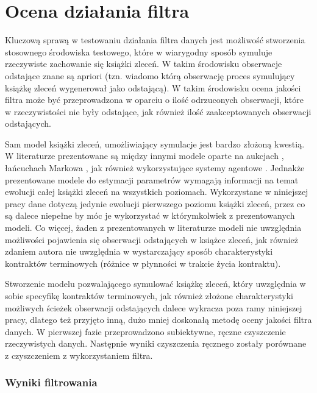 \documentclass[a4paper,12pt,openany, DIV=calc, headsepline]{scrbook}
\begin{document}
\chapter{Ocena działania filtra}

Kluczową sprawą w testowaniu działania filtra danych jest możliwość stworzenia stosownego środowiska testowego, które w wiarygodny sposób symuluje rzeczywiste zachowanie się książki zleceń. W takim środowisku obserwacje odstające znane są apriori (tzn. wiadomo którą obserwację proces symulujący książkę zleceń wygenerował jako odstającą). W takim środowisku ocena jakości filtra może być przeprowadzona w oparciu o ilość odrzuconych obserwacji, które w rzeczywistości nie były odstające, jak również ilość zaakceptowanych obserwacji odstających.

Sam model książki zleceń, umożliwiający symulacje jest bardzo złożoną kwestią. W literaturze prezentowane są między innymi modele oparte na aukcjach \citep{doubleAuction}, łańcuchach Markowa \citep{huang2015simulating}, jak również wykorzystujące systemy agentowe \citep{chiarella2009impact}. Jednakże prezentowane modele do estymacji parametrów wymagają informacji na temat ewolucji całej książki zleceń na wszystkich poziomach. Wykorzystane w niniejszej pracy dane dotyczą jedynie ewolucji pierwszego poziomu książki zleceń, przez co są dalece niepełne by móc je wykorzystać w którymkolwiek z prezentowanych modeli. Co więcej, żaden z prezentowanych w literaturze modeli nie uwzględnia możliwości pojawienia się obserwacji odstających w książce zleceń, jak również zdaniem autora nie uwzględnia w wystarczający sposób charakterystyki kontraktów terminowych (różnice w płynności w trakcie życia kontraktu). 

Stworzenie modelu pozwalającego symulować książkę zleceń, który uwzględnia w sobie specyfikę kontraktów terminowych, jak również złożone charakterystyki możliwych ścieżek obserwacji odstających dalece wykracza poza ramy niniejszej pracy, dlatego też przyjęto inną, dużo mniej doskonałą metodę oceny jakości filtra danych. W pierwszej fazie przeprowadzono subiektywne, ręczne czyszczenie rzeczywistych danych. Następnie wyniki czyszczenia ręcznego zostały porównane z czyszczeniem z wykorzystaniem filtra. 

\subsection{Wyniki filtrowania}
\end{document}
